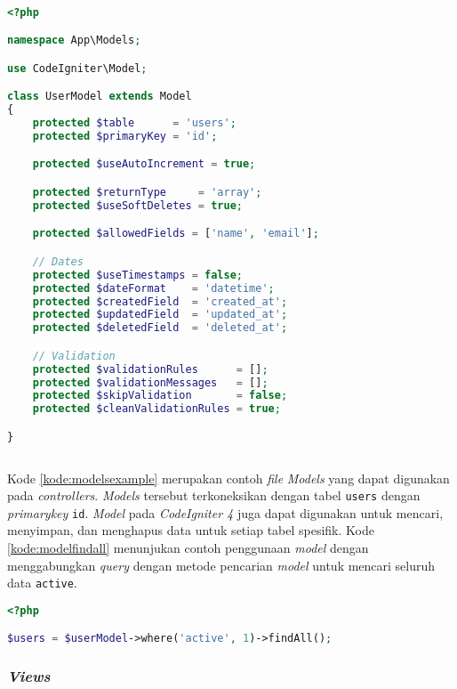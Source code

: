 \begin{lstlisting}[language=PHP, caption=Contoh \textit{Models} pada \textit{CodeIgniter 4},label=kode:modelsexample]

<?php

namespace App\Models;

use CodeIgniter\Model;

class UserModel extends Model
{
    protected $table      = 'users';
    protected $primaryKey = 'id';

    protected $useAutoIncrement = true;

    protected $returnType     = 'array';
    protected $useSoftDeletes = true;

    protected $allowedFields = ['name', 'email'];

    // Dates
    protected $useTimestamps = false;
    protected $dateFormat    = 'datetime';
    protected $createdField  = 'created_at';
    protected $updatedField  = 'updated_at';
    protected $deletedField  = 'deleted_at';

    // Validation
    protected $validationRules      = [];
    protected $validationMessages   = [];
    protected $skipValidation       = false;
    protected $cleanValidationRules = true;

}
    
\end{lstlisting}

Kode \ref{kode:modelsexample} merupakan contoh \textit{file} \textit{Models} yang dapat digunakan pada \textit{controllers}. \textit{Models} tersebut terkoneksikan dengan tabel \texttt{users} dengan \textit{primarykey} \texttt{id}. \textit{Model} pada \textit{CodeIgniter 4} juga dapat digunakan untuk mencari, menyimpan, dan menghapus data untuk setiap tabel spesifik. Kode \ref{kode:modelfindall} menunjukan contoh penggunaan \textit{model} dengan menggabungkan \textit{query} dengan metode pencarian \textit{model} untuk mencari seluruh data \verb|active|.
\begin{lstlisting}[language=PHP, caption=Contoh penggunaan \textit{model} untuk mencari data spesifik,label=kode:modelfindall]
<?php

$users = $userModel->where('active', 1)->findAll();
\end{lstlisting}

\subsubsection{\textit{Views}}

